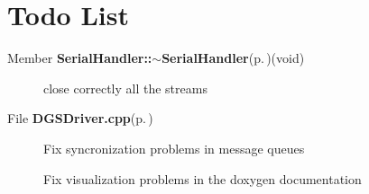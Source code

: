 \section{Todo List}\label{todo}
\label{todo__todo000003}
 \begin{description}
\item[Member {\bf Serial\-Handler::$\sim$Serial\-Handler}{\rm (p.\,\pageref{classSerialHandler_a1})}(void) ]close correctly all the streams \end{description}


\label{todo__todo000001}
 \begin{description}
\item[File {\bf DGSDriver.cpp}{\rm (p.\,\pageref{DGSDriver_8cpp})} ]Fix syncronization problems in message queues 

Fix visualization problems in the doxygen documentation \end{description}
